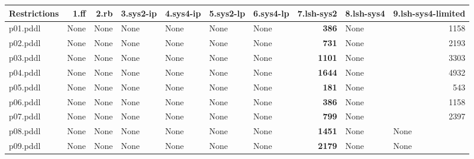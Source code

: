 \documentclass{article}
\begin{document}
\begin{tabular}{@{}lrrrrrrrrr@{}}
Restrictions & 1.ff & 2.rb & 3.sys2-ip & 4.sys4-ip & 5.sys2-lp & 6.sys4-lp & 7.lsh-sys2 & 8.lsh-sys4 & 9.lsh-sys4-limited \\
\midrule
p01.pddl & \multicolumn{1}{|l|}{None} & \multicolumn{1}{|l|}{None} & \multicolumn{1}{|l|}{None} & \multicolumn{1}{|l|}{None} & \multicolumn{1}{|l|}{None} & \multicolumn{1}{|l|}{None} & \textbf{386} & \multicolumn{1}{|l|}{None} & 1158 \\
p02.pddl & \multicolumn{1}{|l|}{None} & \multicolumn{1}{|l|}{None} & \multicolumn{1}{|l|}{None} & \multicolumn{1}{|l|}{None} & \multicolumn{1}{|l|}{None} & \multicolumn{1}{|l|}{None} & \textbf{731} & \multicolumn{1}{|l|}{None} & 2193 \\
p03.pddl & \multicolumn{1}{|l|}{None} & \multicolumn{1}{|l|}{None} & \multicolumn{1}{|l|}{None} & \multicolumn{1}{|l|}{None} & \multicolumn{1}{|l|}{None} & \multicolumn{1}{|l|}{None} & \textbf{1101} & \multicolumn{1}{|l|}{None} & 3303 \\
p04.pddl & \multicolumn{1}{|l|}{None} & \multicolumn{1}{|l|}{None} & \multicolumn{1}{|l|}{None} & \multicolumn{1}{|l|}{None} & \multicolumn{1}{|l|}{None} & \multicolumn{1}{|l|}{None} & \textbf{1644} & \multicolumn{1}{|l|}{None} & 4932 \\
p05.pddl & \multicolumn{1}{|l|}{None} & \multicolumn{1}{|l|}{None} & \multicolumn{1}{|l|}{None} & \multicolumn{1}{|l|}{None} & \multicolumn{1}{|l|}{None} & \multicolumn{1}{|l|}{None} & \textbf{181} & \multicolumn{1}{|l|}{None} & 543 \\
p06.pddl & \multicolumn{1}{|l|}{None} & \multicolumn{1}{|l|}{None} & \multicolumn{1}{|l|}{None} & \multicolumn{1}{|l|}{None} & \multicolumn{1}{|l|}{None} & \multicolumn{1}{|l|}{None} & \textbf{386} & \multicolumn{1}{|l|}{None} & 1158 \\
p07.pddl & \multicolumn{1}{|l|}{None} & \multicolumn{1}{|l|}{None} & \multicolumn{1}{|l|}{None} & \multicolumn{1}{|l|}{None} & \multicolumn{1}{|l|}{None} & \multicolumn{1}{|l|}{None} & \textbf{799} & \multicolumn{1}{|l|}{None} & 2397 \\
p08.pddl & \multicolumn{1}{|l|}{None} & \multicolumn{1}{|l|}{None} & \multicolumn{1}{|l|}{None} & \multicolumn{1}{|l|}{None} & \multicolumn{1}{|l|}{None} & \multicolumn{1}{|l|}{None} & \textbf{1451} & \multicolumn{1}{|l|}{None} & \multicolumn{1}{|l|}{None} \\
p09.pddl & \multicolumn{1}{|l|}{None} & \multicolumn{1}{|l|}{None} & \multicolumn{1}{|l|}{None} & \multicolumn{1}{|l|}{None} & \multicolumn{1}{|l|}{None} & \multicolumn{1}{|l|}{None} & \textbf{2179} & \multicolumn{1}{|l|}{None} & \multicolumn{1}{|l|}{None} \\

\end{tabular}
\end{document}
